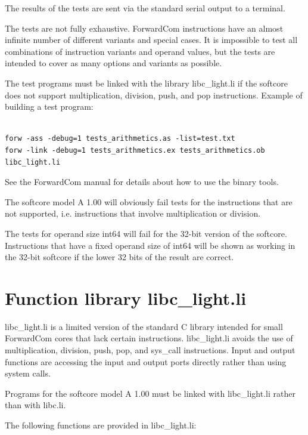 \documentclass[11pt,a4paper,oneside,openright]{report}
\newcommand{\vv}{ \vspace{2mm} }   %
\begin{document}
The results of the tests are sent via the standard serial output to a terminal. 
\vv

The tests are not fully exhaustive. ForwardCom instructions have an almost infinite number of different variants and special cases. It is impossible to test all combinations of instruction variants and operand values, but the tests are intended to cover as many options and variants as possible.
\vv

The test programs must be linked with the library libc\_light.li if the softcore does not support multiplication, division, push, and pop instructions. 
Example of building a test program:

\begin{lstlisting}

forw -ass -debug=1 tests_arithmetics.as -list=test.txt 
forw -link -debug=1 tests_arithmetics.ex tests_arithmetics.ob libc_light.li
\end{lstlisting}
\vv

See the ForwardCom manual for details about how to use the binary tools.
\vv

The softcore model A 1.00 will obviously fail tests for the instructions that are not supported, i.e. instructions that involve multiplication or division. 
\vv

The tests for operand size int64 will fail for the 32-bit version of the softcore. Instructions that have a fixed operand size of int64 will be shown as working in the 32-bit softcore if the lower 32 bits of the result are correct.
\vv

\chapter{Function library libc\_light.li}
libc\_light.li is a limited version of the standard C library intended for small ForwardCom cores that lack certain instructions. libc\_light.li avoids the use of multiplication, division, push, pop, and sys\_call instructions. Input and output functions are accessing the input and output ports directly rather than using system calls.
\vv

Programs for the softcore model A 1.00 must be linked with libc\_light.li rather than with libc.li.
\vv

The following functions are provided in libc\_light.li:
\vv
\end{document}
